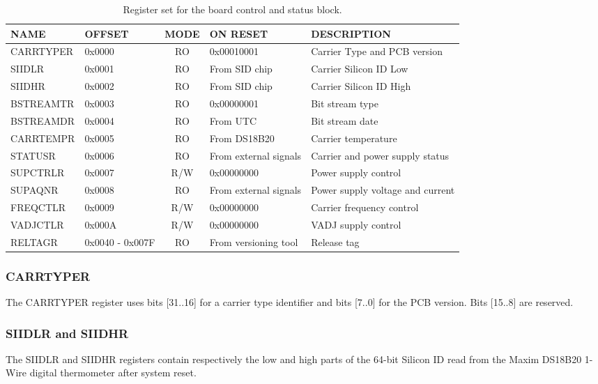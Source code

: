 \documentclass{article}
\begin{document}
\begin{table}[htbp]
  \centering
  \begin{tabular}{|l|p{1.5cm}|c|p{2cm}|p{3cm}|}
    \hline
    \textbf{NAME} & \textbf{OFFSET} & \textbf{MODE} & \textbf{ON RESET} & \textbf{DESCRIPTION} \\
    \hline
    \hline
    CARRTYPER & 0x0000 & RO & 0x00010001 & Carrier Type and PCB version\\
    \hline
    SIIDLR & 0x0001 & RO & From SID chip & Carrier Silicon ID Low \\
    \hline
    SIIDHR & 0x0002 & RO & From SID chip & Carrier Silicon ID High \\
    \hline
    BSTREAMTR & 0x0003 & RO & 0x00000001 & Bit stream type \\
    \hline
    BSTREAMDR & 0x0004 & RO & From UTC & Bit stream date \\
    \hline
    CARRTEMPR & 0x0005 & RO & From DS18B20 & Carrier temperature \\
    \hline
    STATUSR & 0x0006 & RO & From external signals & Carrier and power supply status \\
    \hline
    SUPCTRLR & 0x0007 & R/W & 0x00000000 & Power supply control \\
    \hline
    SUPAQNR & 0x0008 & RO & From external signals & Power supply voltage and current \\
    \hline
    FREQCTLR & 0x0009 & R/W & 0x00000000 & Carrier frequency control \\
    \hline
    VADJCTLR & 0x000A & R/W & 0x00000000 & VADJ supply control \\
    \hline
    RELTAGR & 0x0040 - 0x007F & RO & From versioning tool & Release tag \\
    \hline
  \end{tabular}
  \caption{Register set for the board control and status block.}
  \label{tab:stat_control}
\end{table}

\subsubsection{CARRTYPER}
The CARRTYPER register uses bits [31..16] for a carrier type identifier and bits [7..0] for the PCB version. Bits [15..8] are reserved. 

\subsubsection{SIIDLR and SIIDHR}
The SIIDLR and SIIDHR registers contain respectively the low and high parts of the 64-bit Silicon ID read from the Maxim DS18B20 1-Wire digital thermometer after system reset. 
\end{document}
